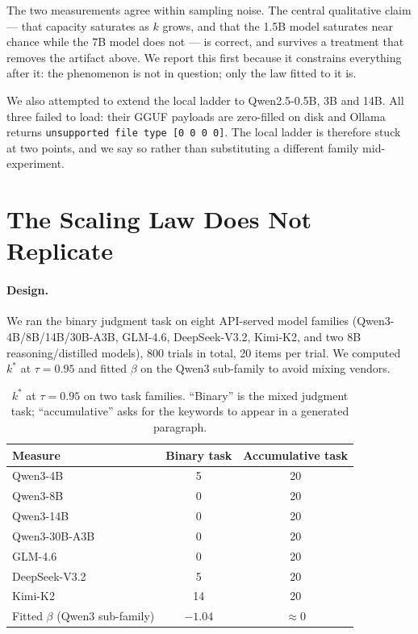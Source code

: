 \documentclass[preprint,12pt]{elsarticle}
\theoremstyle{plain}
\begin{document}
The two measurements agree within sampling noise. The central qualitative claim --- that capacity saturates as $k$ grows, and that the 1.5B model saturates near chance while the 7B model does not --- is correct, and survives a treatment that removes the artifact above. We report this first because it constrains everything after it: the phenomenon is not in question; only the law fitted to it is.

We also attempted to extend the local ladder to Qwen2.5-0.5B, 3B and 14B. All three failed to load: their GGUF payloads are zero-filled on disk and Ollama returns \texttt{unsupported file type [0 0 0 0]}. The local ladder is therefore stuck at two points, and we say so rather than substituting a different family mid-experiment.

\section{The Scaling Law Does Not Replicate}
\label{sec:api}

\paragraph{Design.} We ran the binary judgment task on eight API-served model families (Qwen3-4B/8B/14B/30B-A3B, GLM-4.6, DeepSeek-V3.2, Kimi-K2, and two 8B reasoning/distilled models), 800 trials in total, 20 items per trial. We computed $k^*$ at $\tau = 0.95$ and fitted $\beta$ on the Qwen3 sub-family to avoid mixing vendors.

\begin{table}[H]
\centering
\small
\caption{$k^*$ at $\tau=0.95$ on two task families. ``Binary'' is the mixed judgment task; ``accumulative'' asks for the keywords to appear in a generated paragraph.}
\label{tab:api}
\begin{tabular}{lcc}
\toprule
Measure & Binary task & Accumulative task \\
\midrule
Qwen3-4B       & 5 & 20 \\
Qwen3-8B       & 0 & 20 \\
Qwen3-14B      & 0 & 20 \\
Qwen3-30B-A3B  & 0 & 20 \\
GLM-4.6        & 0 & 20 \\
DeepSeek-V3.2  & 5 & 20 \\
Kimi-K2        & 14 & 20 \\
\midrule
Fitted $\beta$ (Qwen3 sub-family) & $-1.04$ & $\approx 0$ \\
\bottomrule
\end{tabular}
\end{table}
\end{document}
